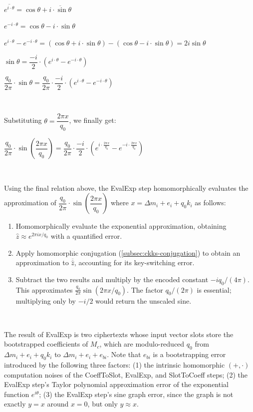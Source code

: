 $ $

$\overline{e^{i\cdot \theta}} = \cos \theta + \overline{i \cdot \sin \theta} $

$ e^{-i\cdot \theta} = \cos \theta - i \cdot \sin \theta$

$ e^{i\cdot \theta} - e^{-i\cdot \theta} = (\cos \theta + i \cdot \sin \theta) - (\cos \theta - i \cdot \sin \theta) = 2i\sin \theta$

$\sin \theta = \dfrac{-i}{2} \cdot (e^{i\cdot \theta} - e^{-i\cdot \theta})$

$\dfrac{q_0}{2\pi}\cdot \sin \theta = \dfrac{q_0}{2\pi}\cdot \dfrac{-i}{2} \cdot (e^{i\cdot \theta} - e^{-i\cdot \theta})$

$ $

Substituting $\theta = \dfrac{2\pi x}{q_0}$, we finally get:

$\dfrac{q_0}{2\pi}\cdot \sin \left(\dfrac{2\pi x}{q_0}\right) = \dfrac{q_0}{2\pi}\cdot \dfrac{-i}{2} \cdot (e^{i\cdot \frac{2\pi x}{q_0}} - e^{-i\cdot \frac{2\pi x}{q_0}})$

$ $

Using the final relation above, the \textsf{EvalExp} step homomorphically evaluates the approximation of $\dfrac{q_0}{2\pi}\cdot \sin \left(\dfrac{2\pi x}{q_0}\right)$ where $x = \Delta m_i + e_i + q_0k_i$ as follows:

\begin{enumerate}
\item Homomorphically evaluate the exponential approximation, obtaining $\widehat z\approx e^{2\pi ix/q_0}$ with a quantified error.

\item Apply homomorphic conjugation (\autoref{subsec:ckks-conjugation}) to obtain an approximation to $\overline{\widehat z}$, accounting for its key-switching error.

\item Subtract the two results and multiply by the encoded constant $-iq_0/(4\pi)$. This approximates $\frac{q_0}{2\pi}\sin(2\pi x/q_0)$. The factor $q_0/(2\pi)$ is essential; multiplying only by $-i/2$ would return the unscaled sine.
\end{enumerate}

$ $

The result of \textsf{EvalExp} is two ciphertexts whose input vector slots store the bootstrapped coefficients of $M_c$, which are modulo-reduced $q_0$ from $\Delta m_i + e_i + q_0k_i$ to $\Delta m_i + e_i + e_{bi}$. Note that $e_{bi}$ is a bootstrapping error introduced by the following three factors: (1) the intrinsic homomorphic $(+, \cdot)$ computation noises of the \textsf{CoeffToSlot}, \textsf{EvalExp}, and \textsf{SlotToCoeff} steps; (2) the \textsf{EvalExp} step's Taylor polynomial approximation error of the exponential function $e^{i\theta}$; (3) the \textsf{EvalExp} step's sine graph error, since the graph is not exactly $y=x$ around $x=0$, but only $y \approx x$.

